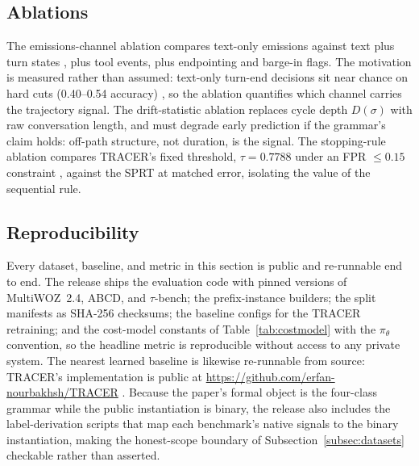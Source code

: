 \subsection{Ablations}
The emissions-channel ablation compares text-only emissions against text plus turn states \citep{x2turn2026}, plus tool events, plus endpointing and barge-in flags.
The motivation is measured rather than assumed: text-only turn-end decisions sit near chance on hard cuts (0.40--0.54 accuracy) \citep{garcia2026asking}, so the ablation quantifies which channel carries the trajectory signal.
The drift-statistic ablation replaces cycle depth $D(\sigma)$ with raw conversation length, and must degrade early prediction if the grammar's claim holds: off-path structure, not duration, is the signal.
The stopping-rule ablation compares TRACER's fixed threshold, $\tau = 0.7788$ under an FPR $\leq 0.15$ constraint \citep{nourbakhsh2026tracer}, against the SPRT at matched error, isolating the value of the sequential rule.

\subsection{Reproducibility}
Every dataset, baseline, and metric in this section is public and re-runnable end to end.
The release ships the evaluation code with pinned versions of MultiWOZ~2.4, ABCD, and $\tau$-bench; the prefix-instance builders; the split manifests as SHA-256 checksums; the baseline configs for the TRACER retraining; and the cost-model constants of Table~\ref{tab:costmodel} with the $\pi_\theta$ convention, so the headline metric is reproducible without access to any private system.
The nearest learned baseline is likewise re-runnable from source: TRACER's implementation is public at \url{https://github.com/erfan-nourbakhsh/TRACER} \citep{nourbakhsh2026tracer}.
Because the paper's formal object is the four-class grammar while the public instantiation is binary, the release also includes the label-derivation scripts that map each benchmark's native signals to the binary instantiation, making the honest-scope boundary of Subsection~\ref{subsec:datasets} checkable rather than asserted.
